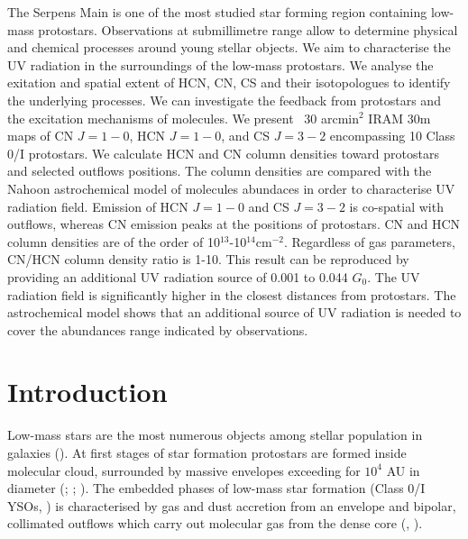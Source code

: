 \documentclass{aa}
\begin{document}
  \abstract
   {The Serpens Main is one of the most studied star forming region containing low-mass protostars. Observations at submillimetre range allow to determine physical and chemical processes around young stellar objects.} %
   {We aim to characterise the UV radiation in the surroundings of the low-mass protostars. We analyse the exitation and spatial extent of HCN, CN, CS and their isotopologues to identify the underlying processes. We can investigate the feedback from protostars and the excitation mechanisms of molecules. }
   {We present ~30 arcmin$^2$ IRAM 30m maps of CN $J=1-0$, HCN $J=1-0$, and CS $J=3-2$ encompassing 10 Class 0/I protostars. We calculate HCN and CN column densities toward protostars and selected outflows positions. The column densities are compared with the Nahoon astrochemical model of molecules abundaces in order to characterise UV radiation field.}
   {Emission of HCN $J=1-0$ and CS $J=3-2$ is co-spatial with outflows, whereas CN emission peaks at the positions of protostars. CN and HCN column densities are of the order of 10$^{13}$-10$^{14}$cm$^{-2}$. Regardless of gas parameters, CN/HCN column density ratio is 1-10. This result can be reproduced by providing an additional UV radiation source of 0.001 to 0.044 $G_0$.}
   {The UV radiation field is significantly higher in the closest distances from protostars. The astrochemical model shows that an additional source of UV radiation is needed to cover the abundances range indicated by observations.}


   \maketitle
%

\section{Introduction}
Low-mass stars are the most numerous objects among stellar population in galaxies (\cite{Kro02}). At first stages of star formation protostars are formed inside molecular cloud, surrounded by massive envelopes exceeding for $10^4$ AU in diameter (\cite{Lad87}; \cite{Lar03}; \cite{Ber07}). The embedded phases of low-mass star formation (Class 0/I YSOs, \cite{And93}) is characterised by gas and dust accretion from an envelope and bipolar, collimated outflows which carry out molecular gas from the dense core (\cite{Zuc76}, \cite{Arc06}). 
\end{document}
